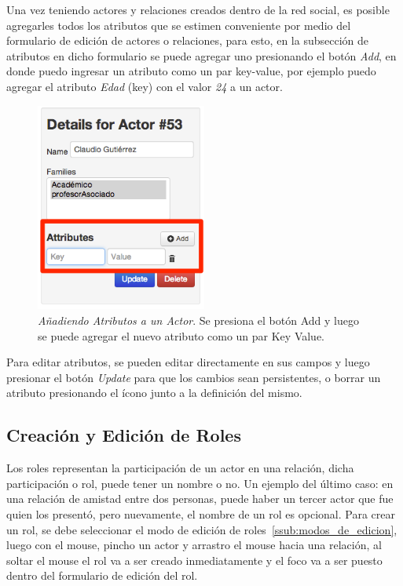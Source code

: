 Una vez teniendo actores y relaciones creados dentro de la red social, es posible agregarles todos los atributos que se estimen conveniente por medio del formulario de edición de actores o relaciones, para esto, en la subsección de atributos en dicho formulario se puede agregar uno presionando el botón \emph{Add}, en donde puedo ingresar un atributo como un par key-value, por ejemplo puedo agregar el atributo \emph{Edad} (key) con el valor \emph{24} a un actor.

\begin{figure}[H]
  \centering
  \includegraphics[width=0.5\textwidth]{images/insercion_atributos.png}
  \caption[Añadiendo Atributos a un Actor]{\emph{Añadiendo Atributos a un Actor}. Se presiona el botón Add y luego se puede agregar el nuevo atributo como un par Key Value.}
  \label{insercion_atributos}
\end{figure}

Para editar atributos, se pueden editar directamente en sus campos y luego presionar el botón \emph{Update} para que los cambios sean persistentes, o borrar un atributo presionando el ícono junto a la definición del mismo.


\subsection{Creación y Edición de Roles} %
\label{sub:creacion_y_edicion_de_roles}

Los roles representan la participación de un actor en una relación, dicha participación o rol, puede tener un nombre o no. Un ejemplo del último caso: en una relación de amistad entre dos personas, puede haber un tercer actor que fue quien los presentó, pero nuevamente, el nombre de un rol es opcional. Para crear un rol, se debe seleccionar el modo de edición de roles~\ref{ssub:modos_de_edicion}, luego con el mouse, pincho un actor y arrastro el mouse hacia una relación, al soltar el mouse el rol va a ser creado inmediatamente y el foco va a ser puesto dentro del formulario de edición del rol.

